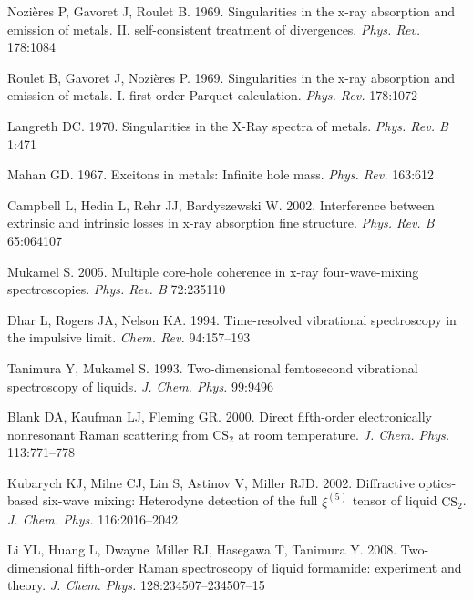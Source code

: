 \documentclass{ar-1col}
\begin{document}
\begin{thebibliography}{000}
{Nozi\`{e}res} P, {Gavoret} J, {Roulet} B. 1969. Singularities in the {x-ray}
  absorption and emission of metals. {II.} {self-consistent} treatment of
  divergences. \textit{Phys. Rev.} 178:1084

{Roulet} B, {Gavoret} J, {Nozi\`{e}res} P. 1969. Singularities in the {x-ray}
  absorption and emission of metals. {I}. {first-order} {P}arquet calculation.
  \textit{Phys. Rev.} 178:1072

Langreth DC. 1970. Singularities in the {X-Ray} spectra of metals.
  \textit{Phys. Rev. B} 1:471

Mahan GD. 1967. Excitons in metals: Infinite hole mass. \textit{Phys. Rev.}
  163:612

Campbell L, Hedin L, Rehr JJ, Bardyszewski W. 2002. Interference between
  extrinsic and intrinsic losses in x-ray absorption fine structure.
  \textit{Phys. Rev. B} 65:064107

Mukamel S. 2005. Multiple core-hole coherence in x-ray four-wave-mixing
  spectroscopies. \textit{Phys. Rev. B} 72:235110

Dhar L, Rogers JA, Nelson KA. 1994. Time-resolved vibrational spectroscopy in
  the impulsive limit. \textit{Chem. Rev.} 94:157--193

Tanimura Y, Mukamel S. 1993. Two-dimensional femtosecond vibrational
  spectroscopy of liquids. \textit{J. Chem. Phys.} 99:9496

Blank DA, Kaufman LJ, Fleming GR. 2000. Direct fifth-order electronically
  nonresonant {R}aman scattering from $\textrm{CS}_2$ at room temperature.
  \textit{J. Chem. Phys.} 113:771--778

Kubarych KJ, Milne CJ, Lin S, Astinov V, Miller RJD. 2002. Diffractive
  optics-based six-wave mixing: Heterodyne detection of the full $\xi^{(5)}$
  tensor of liquid $\textrm{CS}_2$. \textit{J. Chem. Phys.} 116:2016--2042

Li YL, Huang L, Dwayne~Miller RJ, Hasegawa T, Tanimura Y. 2008. Two-dimensional
  fifth-order {R}aman spectroscopy of liquid formamide: experiment and theory.
  \textit{J. Chem. Phys.} 128:234507--234507--15


\end{thebibliography}
\end{document}
